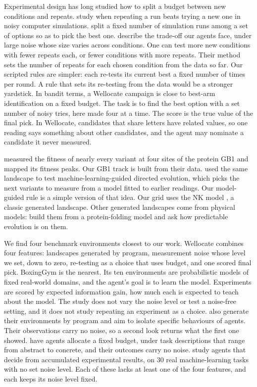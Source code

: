 Experimental design has long studied how to split a budget between new conditions and repeats.
\citet{binois2019replication} study when repeating a run beats trying a new one in noisy computer simulations.
\citet{chen2000ocba} split a fixed number of simulation runs among a set of options so as to pick the best one.
\citet{dai2023replicable} describe the trade-off our agents face, under large noise whose size varies across
conditions. One can test more new conditions with fewer repeats each, or fewer conditions with more repeats. Their
method sets the number of repeats for each chosen condition from the data so far. Our scripted rules are simpler: each
re-tests its current best a fixed number of times per round. A rule that sets its re-testing from the data would be a
stronger yardstick. In bandit terms, a Wellocate campaign is close to best-arm identification on a fixed budget. The
task is to find the best option with a set number of noisy tries, here made four at a time. The score is the true value of the final pick. In Wellocate, candidates that share letters have related values, so one
reading says something about other candidates, and the agent may nominate a candidate it never measured.

\citet{wu2016adaptation} measured the fitness of nearly every variant at four sites of the protein GB1 and mapped its
fitness peaks. Our GB1 track is built from their data. \citet{wu2019mlde} used the same landscape to test
machine-learning-guided directed evolution, which picks the next variants to measure from a model fitted to earlier
readings. Our model-guided rule is a simple version of that idea. Our grid uses the NK model \citep{kauffman1989nk}, a
classic generated landscape. Other generated landscapes come from physical models: \citet{lobkovsky2011predictability}
build them from a protein-folding model and ask how predictable evolution is on them.

We find four benchmark environments closest to our work. Wellocate combines four features: landscapes generated by program,
measurement noise whose level we set, down to zero, re-testing as a choice that uses budget, and one scored final pick.
BoxingGym \citep{gandhi2025boxinggym} is the nearest. Its ten environments are probabilistic models of fixed real-world
domains, and the agent's goal is to learn the model. Experiments are scored by expected information gain, how much
each is expected to teach about the model. The study does not vary the noise level or test a noise-free setting, and
it does not study repeating an experiment as a choice. \citet{park2026exploration} also generate their environments by
program and aim to isolate specific behaviours of agents. Their observations carry no noise, so a second look returns
what the first one showed. \citet{wang2026allocbench} have agents allocate a fixed budget, under task descriptions that
range from abstract to concrete, and their outcomes carry no noise. \citet{huai2026agenthpo} study agents that decide
from accumulated experimental results, on 30 real machine-learning tasks with no set noise level. Each of these
lacks at least one of the four features, and each keeps its noise level fixed.
